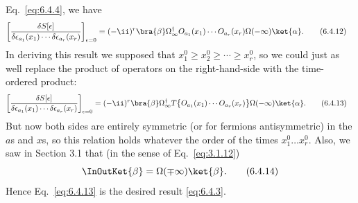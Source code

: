 
Eq.~\eqref{eq:6.4.4}, we have
\begin{align}
\left[
  \frac{\delta S[\epsilon]}
  {\delta\epsilon_{a_1}(x_1)\cdots\delta\epsilon_{a_r}(x_r)}
\right]_{\epsilon=0}
={}&(-\ii)^r
\bra{\beta}\Omega^\dagger_{\infty}
O_{a_1}(x_1)\cdots O_{a_r}(x_r)
\Omega(-\infty)\ket{\alpha}.
\tag{6.4.12}
\label{eq:6.4.12}
\end{align}
In deriving this result we supposed that
$x_1^0\geq x_2^0\geq\cdots\geq x_r^0$, so we could just as well replace
the product of operators on the right-hand-side with the time-ordered
product:
\begin{align}
\left[
  \frac{\delta S[\epsilon]}
  {\delta\epsilon_{a_1}(x_1)\cdots\delta\epsilon_{a_r}(x_r)}
\right]_{\epsilon=0}
={}&(-\ii)^r
\bra{\beta}\Omega^\dagger_{\infty}
T\bigl\{O_{a_1}(x_1)\cdots O_{a_r}(x_r)\bigr\}
\Omega(-\infty)\ket{\alpha}.
\tag{6.4.13}
\label{eq:6.4.13}
\end{align}
But now both sides are entirely symmetric (or for fermions antisymmetric)
in the $a$s and $x$s, so this relation holds whatever the order of the times
$x_1^0\ldots x_r^0$. Also, we saw in Section 3.1 that (in the sense of
Eq.~\eqref{eq:3.1.12})
\begin{equation}
\InOutKet{\beta}=\Omega(\mp\infty)\ket{\beta}.
\tag{6.4.14}
\label{eq:6.4.14}
\end{equation}
Hence Eq.~\eqref{eq:6.4.13} is the desired result \eqref{eq:6.4.3}.


